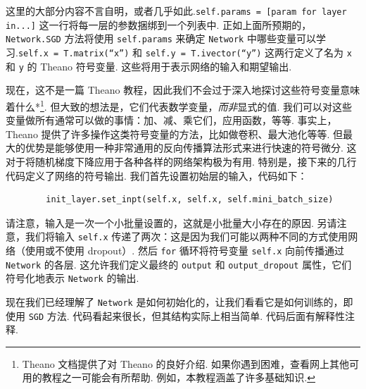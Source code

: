 这里的大部分内容不言自明，或者几乎如此.\texttt{self.params = [param for layer in...]} 这一行将每一层的参数捆绑到一个列表中. 正如上面所预期的，\texttt{Network.SGD} 方法将使用 \texttt{self.params} 来确定 \texttt{Network} 中哪些变量可以学习.\texttt{self.x = T.matrix(``x'')} 和 \texttt{self.y = T.ivector(``y'')} 这两行定义了名为 \texttt{x} 和 \texttt{y} 的 Theano 符号变量. 这些将用于表示网络的输入和期望输出.

现在，这不是一篇 Theano 教程，因此我们不会过于深入地探讨这些符号变量意味着什么*\footnote{Theano 文档提供了对 Theano 的良好介绍. 如果你遇到困难，查看网上其他可用的教程之一可能会有所帮助. 例如，本教程涵盖了许多基础知识.}. 但大致的想法是，它们代表数学变量，\emph{而非}显式的值. 我们可以对这些变量做所有通常可以做的事情：加、减、乘它们，应用函数，等等. 事实上，Theano 提供了许多操作这类符号变量的方法，比如做卷积、最大池化等等. 但最大的优势是能够使用一种非常通用的反向传播算法形式来进行快速的符号微分. 这对于将随机梯度下降应用于各种各样的网络架构极为有用. 特别是，接下来的几行代码定义了网络的符号输出. 我们首先设置初始层的输入，代码如下：

\begin{lstlisting}
        init_layer.set_inpt(self.x, self.x, self.mini_batch_size)

\end{lstlisting}

请注意，输入是一次一个小批量设置的，这就是小批量大小存在的原因. 另请注意，我们将输入 \texttt{self.x} 传递了两次：这是因为我们可能以两种不同的方式使用网络（使用或不使用 dropout）. 然后 \texttt{for} 循环将符号变量 \texttt{self.x} 向前传播通过 \texttt{Network} 的各层. 这允许我们定义最终的 \texttt{output} 和 \texttt{output\_\allowbreak{}dropout} 属性，它们符号化地表示 \texttt{Network} 的输出.

现在我们已经理解了 \texttt{Network} 是如何初始化的，让我们看看它是如何训练的，即使用 \texttt{SGD} 方法. 代码看起来很长，但其结构实际上相当简单. 代码后面有解释性注释.


